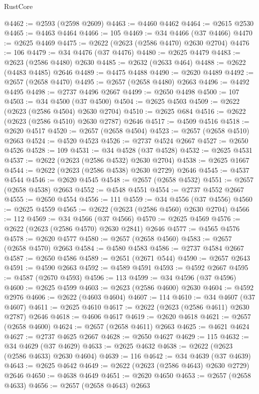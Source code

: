 \begin{lexlean}{RustCore}
\begin{coremodule}
@4462 := @2593 (@2598 @2609)
@4463 := @4460 @4462
@4464 := @2615 @2530
@4465 := @4463 @4464
@4466 := 105
@4469 := @34 @4466 (@37 @4466)
@4470 := @2625 @4469
@4475 := @2622 (@2623 (@2586 @4470) @2630 @2704)
@4476 := 106
@4479 := @34 @4476 (@37 @4476)
@4480 := @2625 @4479
@4483 := @2623 (@2586 @4480) @2630
@4485 := @2632 (@2633 @464)
@4488 := @2622 (@4483 @4485) @2646
@4489 := @4475 @4488
@4490 := @2620 @4489
@4492 := @2657 (@2658 @4470)
@4495 := @2657 (@2658 @4480) @2663
@4496 := @4492 @4495
@4498 := @2737 @4496 @2667
@4499 := @2650 @4498
@4500 := 107
@4503 := @34 @4500 (@37 @4500)
@4504 := @2625 @4503
@4509 := @2622 (@2623 (@2586 @4504) @2630 @2704)
@4510 := @2625 @684
@4516 := @2622 (@2623 (@2586 @4510) @2630 @2787) @2646
@4517 := @4509 @4516
@4518 := @2620 @4517
@4520 := @2657 (@2658 @4504)
@4523 := @2657 (@2658 @4510) @2663
@4524 := @4520 @4523
@4526 := @2737 @4524 @2667
@4527 := @2650 @4526
@4528 := 109
@4531 := @34 @4528 (@37 @4528)
@4532 := @2625 @4531
@4537 := @2622 (@2623 (@2586 @4532) @2630 @2704)
@4538 := @2625 @1667
@4544 := @2622 (@2623 (@2586 @4538) @2630 @2729) @2646
@4545 := @4537 @4544
@4546 := @2620 @4545
@4548 := @2657 (@2658 @4532)
@4551 := @2657 (@2658 @4538) @2663
@4552 := @4548 @4551
@4554 := @2737 @4552 @2667
@4555 := @2650 @4554
@4556 := 111
@4559 := @34 @4556 (@37 @4556)
@4560 := @2625 @4559
@4565 := @2622 (@2623 (@2586 @4560) @2630 @2704)
@4566 := 112
@4569 := @34 @4566 (@37 @4566)
@4570 := @2625 @4569
@4576 := @2622 (@2623 (@2586 @4570) @2630 @2841) @2646
@4577 := @4565 @4576
@4578 := @2620 @4577
@4580 := @2657 (@2658 @4560)
@4583 := @2657 (@2658 @4570) @2663
@4584 := @4580 @4583
@4586 := @2737 @4584 @2667
@4587 := @2650 @4586
@4589 := @2651 (@2671 @544)
@4590 := @2657 @2643
@4591 := @4590 @2663
@4592 := @4589 @4591
@4593 := @4592 @2667
@4595 := @4587 (@2670 @4593)
@4596 := 113
@4599 := @34 @4596 (@37 @4596)
@4600 := @2625 @4599
@4603 := @2623 (@2586 @4600) @2630
@4604 := @4592 @2976
@4606 := @2622 (@4603 @4604)
@4607 := 114
@4610 := @34 @4607 (@37 @4607)
@4611 := @2625 @4610
@4617 := @2622 (@2623 (@2586 @4611) @2630 @2787) @2646
@4618 := @4606 @4617
@4619 := @2620 @4618
@4621 := @2657 (@2658 @4600)
@4624 := @2657 (@2658 @4611) @2663
@4625 := @4621 @4624
@4627 := @2737 @4625 @2667
@4628 := @2650 @4627
@4629 := 115
@4632 := @34 @4629 (@37 @4629)
@4633 := @2625 @4632
@4638 := @2622 (@2623 (@2586 @4633) @2630 @4604)
@4639 := 116
@4642 := @34 @4639 (@37 @4639)
@4643 := @2625 @4642
@4649 := @2622 (@2623 (@2586 @4643) @2630 @2729) @2646
@4650 := @4638 @4649
@4651 := @2620 @4650
@4653 := @2657 (@2658 @4633)
@4656 := @2657 (@2658 @4643) @2663

\end{coremodule}
\end{lexlean}
